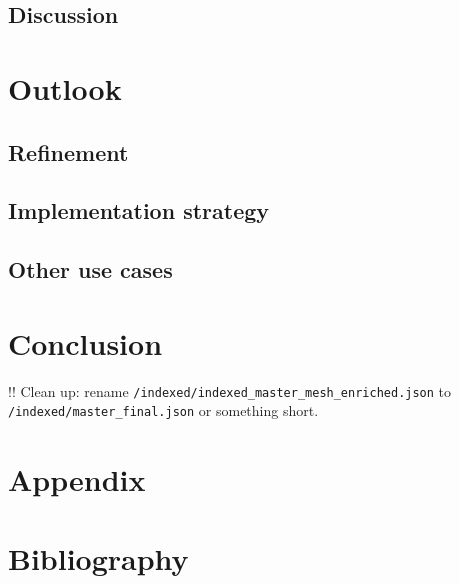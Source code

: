 \hypertarget{discussion-1}{%
\subsection{Discussion}\label{discussion-1}}

\hypertarget{outlook}{%
\section{Outlook}\label{outlook}}

\hypertarget{refinement}{%
\subsection{Refinement}\label{refinement}}

\hypertarget{implementation-strategy}{%
\subsection{Implementation strategy}\label{implementation-strategy}}

\hypertarget{other-use-cases}{%
\subsection{Other use cases}\label{other-use-cases}}

\hypertarget{conclusion}{%
\section{Conclusion}\label{conclusion}}

!! Clean up: rename
\texttt{/indexed/indexed\_master\_mesh\_enriched.json} to
\texttt{/indexed/master\_final.json} or something short.

\hypertarget{appendix}{%
\section{Appendix}\label{appendix}}

\hypertarget{bibliography}{%
\section{Bibliography}\label{bibliography}}

